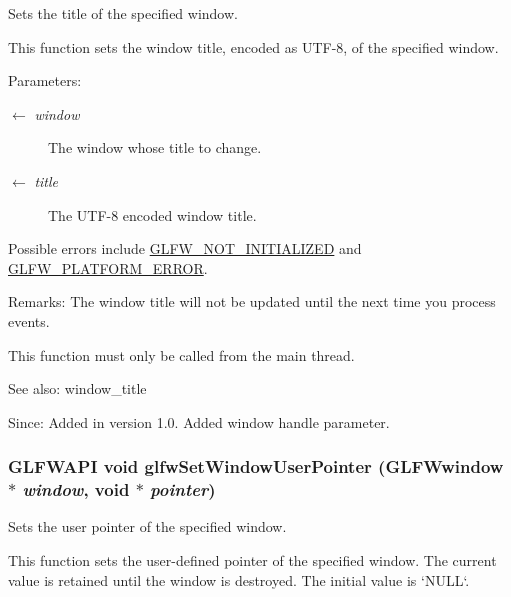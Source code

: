 Sets the title of the specified window. 

This function sets the window title, encoded as UTF-8, of the specified window.

\begin{Desc}
\item[Parameters:]
\begin{description}
\item[\mbox{$\leftarrow$} {\em window}]The window whose title to change. \item[\mbox{$\leftarrow$} {\em title}]The UTF-8 encoded window title.\end{description}
\end{Desc}
Possible errors include \hyperlink{group__errors_g2374ee02c177f12e1fa76ff3ed15e14a}{GLFW\_\-NOT\_\-INITIALIZED} and \hyperlink{group__errors_gd44162d78100ea5e87cdd38426b8c7a1}{GLFW\_\-PLATFORM\_\-ERROR}.

\begin{Desc}
\item[Remarks:]The window title will not be updated until the next time you process events.\end{Desc}
This function must only be called from the main thread.

\begin{Desc}
\item[See also:]window\_\-title\end{Desc}
\begin{Desc}
\item[Since:]Added in version 1.0.  Added window handle parameter. \end{Desc}
\hypertarget{group__window_gcc9e68faee3c1763b54cd9bc405cf43e}{
\subsubsection[glfwSetWindowUserPointer]{\setlength{\rightskip}{0pt plus 5cm}GLFWAPI void glfwSetWindowUserPointer ({\bf GLFWwindow} $\ast$ {\em window}, \/  void $\ast$ {\em pointer})}}
\label{group__window_gcc9e68faee3c1763b54cd9bc405cf43e}


Sets the user pointer of the specified window. 

This function sets the user-defined pointer of the specified window. The current value is retained until the window is destroyed. The initial value is `NULL`.

